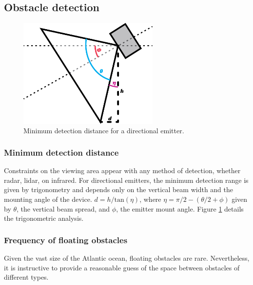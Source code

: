 \appendix
\renewcommand{\thesubsection}{\Alph{subsection}}
\renewcommand{\thesubsubsection}{\thesubsection.\arabic{subsubsection}}
\subsection{\label{app:AppendixA}Obstacle detection} 

\begin{figure}[h]
\includegraphics[width=70mm,natwidth=505,natheight=394]{"./image/directional-emitters"}
\caption[Minimum distance to detected obstacle.]{\label{fig:emitter-angle}Minimum detection distance for a directional emitter.}
\end{figure}

\subsubsection{\label{app:minimum-detection-distance}Minimum detection distance}
Constraints on the viewing area appear with any method of detection, whether radar, lidar, on infrared. For directional emitters, the minimum detection range is given by trigonometry and depends only on the vertical beam width and the mounting angle of the device. $d = h/\text{tan}(\eta)$, where $\eta=\pi/2-(\theta/2+\phi)$ given by $\theta$, the vertical beam spread, and $\phi$, the emitter mount angle. Figure \ref{fig:emitter-angle} details the trigonometric analysis.

\subsubsection{\label{app:obstacle-frequency}Frequency of floating obstacles}
Given the vast size of the Atlantic ocean, floating obstacles are rare. Nevertheless, it is instructive to provide a reasonable guess of the space between obstacles of different types.

